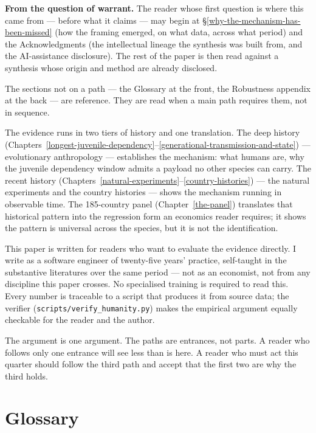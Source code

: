 \documentclass[12pt,letterpaper]{article}
\begin{document}
\textbf{From the question of warrant.} The reader whose first question
is where this came from --- before what it claims --- may begin at
\S\ref{why-the-mechanism-has-been-missed} (how the framing emerged, on
what data, across what period) and the Acknowledgments (the
intellectual lineage the synthesis was built from, and the
AI-assistance disclosure). The rest of the paper is then read against
a synthesis whose origin and method are already disclosed.

The sections not on a path --- the Glossary at the front, the
Robustness appendix at the back --- are reference. They are read when
a main path requires them, not in sequence.

The evidence runs in two tiers of history and one translation. The deep history (Chapters~\ref{longest-juvenile-dependency}--\ref{generational-transmission-and-state}) --- evolutionary anthropology --- establishes the mechanism: what humans are, why the juvenile dependency window admits a payload no other species can carry. The recent history (Chapters~\ref{natural-experiments}--\ref{country-histories}) --- the natural experiments and the country histories --- shows the mechanism running in observable time. The 185-country panel (Chapter~\ref{the-panel}) translates that historical pattern into the regression form an economics reader requires; it shows the pattern is universal across the species, but it is not the identification.

This paper is written for readers who want to evaluate the evidence directly. I write as a software engineer of twenty-five years' practice, self-taught in the substantive literatures over the same period --- not as an economist, not from any discipline this paper crosses. No specialised training is required to read this. Every number is traceable to a script that produces it from source data; the verifier (\texttt{scripts/verify\_humanity.py}) makes the empirical argument equally checkable for the reader and the author.

The argument is one argument. The paths are entrances, not parts. A
reader who follows only one entrance will see less than is here. A
reader who must act this quarter should follow the third path and
accept that the first two are why the third holds.

\newpage

\section*{Glossary}\label{glossary}
\end{document}
